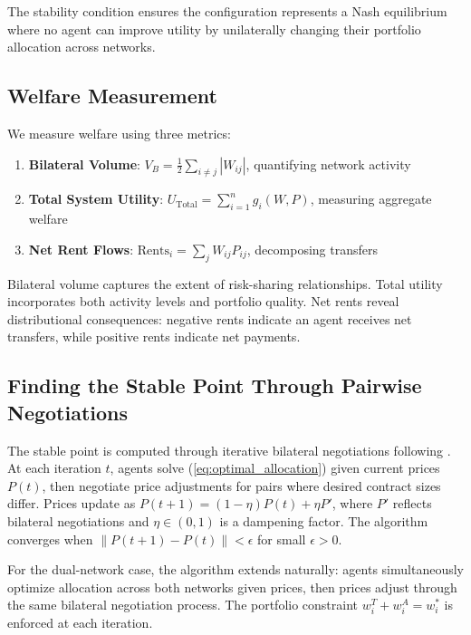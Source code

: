 \documentclass[12pt]{article}
\begin{document}
The stability condition ensures the configuration represents a Nash equilibrium where no agent can improve utility by unilaterally changing their portfolio allocation across networks.

\subsection{Welfare Measurement}

We measure welfare using three metrics:

\begin{enumerate}[noitemsep]
    \item \textbf{Bilateral Volume}: $V_B = \frac{1}{2}\sum_{i \neq j} |W_{ij}|$, quantifying network activity
    \item \textbf{Total System Utility}: $U_{\text{Total}} = \sum_{i=1}^n g_i(W, P)$, measuring aggregate welfare
    \item \textbf{Net Rent Flows}: $\text{Rents}_i = \sum_j W_{ij} P_{ij}$, decomposing transfers
\end{enumerate}

Bilateral volume captures the extent of risk-sharing relationships. Total utility incorporates both activity levels and portfolio quality. Net rents reveal distributional consequences: negative rents indicate an agent receives net transfers, while positive rents indicate net payments.

\subsection{Finding the Stable Point Through Pairwise Negotiations}

The stable point is computed through iterative bilateral negotiations following \citet{jalan_incentive-aware_2024}. At each iteration $t$, agents solve (\ref{eq:optimal_allocation}) given current prices $P(t)$, then negotiate price adjustments for pairs where desired contract sizes differ. Prices update as $P(t+1) = (1-\eta)P(t) + \eta P'$, where $P'$ reflects bilateral negotiations and $\eta \in (0,1)$ is a dampening factor. The algorithm converges when $\|P(t+1) - P(t)\| < \epsilon$ for small $\epsilon > 0$.

For the dual-network case, the algorithm extends naturally: agents simultaneously optimize allocation across both networks given prices, then prices adjust through the same bilateral negotiation process. The portfolio constraint $w_i^T + w_i^A = w_i^*$ is enforced at each iteration.
\end{document}
